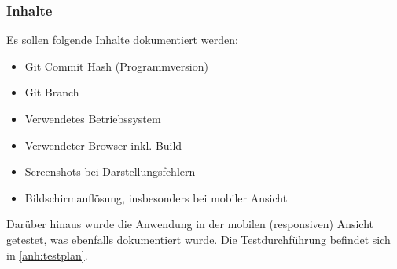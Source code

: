 \subsubsection*{Inhalte}
Es sollen folgende Inhalte dokumentiert werden:
\begin{itemize}
    \item Git Commit Hash (Programmversion)
    \item Git Branch
    \item Verwendetes Betriebssystem
    \item Verwendeter Browser inkl. Build
    \item Screenshots bei Darstellungsfehlern
    \item Bildschirmauflösung, insbesonders bei mobiler Ansicht
\end{itemize}
Darüber hinaus wurde die Anwendung in der mobilen (responsiven) Ansicht getestet, was ebenfalls dokumentiert wurde.
Die Testdurchführung befindet sich in \autoref{anh:testplan}.

